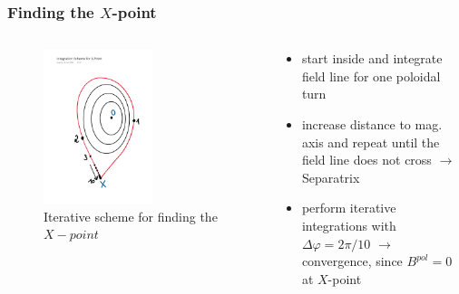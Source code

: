 \documentclass{beamer}
\begin{document}
\begin{frame}
\frametitle{Finding the $X$-point}
\vspace{-1 cm}
\begin{columns}[onlytextwidth]
	\begin{column}{0.5\textwidth}
		\begin{center}
			\begin{figure}
				\includegraphics[trim={6cm 2.5cm 1.5cm 5cm cm},clip,width=0.6\textwidth]{FIGURES/getXpoint.pdf}
				\caption{Iterative scheme for finding the $X-point$}
			\end{figure}
		\end{center}
	\end{column}
	\begin{column}{0.5\textwidth}
		\vspace{0 cm}
		\begin{center}
			\begin{itemize}
				\item start inside and integrate field line for one poloidal turn
				\item increase distance to mag. axis and repeat until the field line does not cross $\rightarrow$ Separatrix
				\item perform iterative integrations with $\Delta\varphi= 2\pi/10$
				$\rightarrow$ convergence, since $B^{pol} = 0$ at $X$-point
			\end{itemize}
		\end{center}
	\end{column}
\end{columns}
\end{frame}
\end{document}
